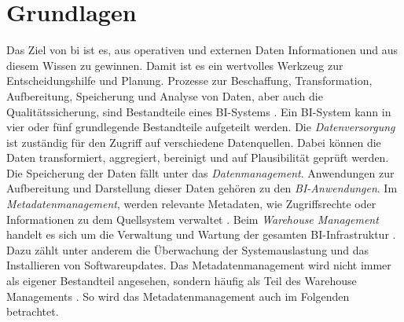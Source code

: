 \chapter{Grundlagen} %
\label{ch:background}
Das Ziel von \ac{bi} ist es, aus operativen und externen Daten Informationen und aus diesem Wissen zu gewinnen. Damit ist es ein wertvolles Werkzeug zur Entscheidungshilfe und Planung. Prozesse zur Beschaffung, Transformation, Aufbereitung, Speicherung und Analyse von Daten, aber auch die Qualitätssicherung, sind Bestandteile eines BI-Systems \cite{muller_business_2013}. Ein BI-System kann in vier oder fünf grundlegende Bestandteile aufgeteilt werden. Die \textit{Datenversorgung} ist zuständig für den Zugriff auf verschiedene Datenquellen. Dabei können die Daten transformiert, aggregiert, bereinigt und auf Plausibilität geprüft werden. Die Speicherung der Daten fällt unter das \textit{Datenmanagement}. Anwendungen zur Aufbereitung und Darstellung dieser Daten gehören zu den \textit{BI-Anwendungen}. Im \textit{Metadatenmanagement}, werden relevante Metadaten, wie Zugriffsrechte oder Informationen zu dem Quellsystem verwaltet \cite{kemper_bi-glossar_2008}. Beim \textit{Warehouse Management} handelt es sich um die Verwaltung und Wartung der gesamten BI-Infrastruktur \cite{grunwald_business_2009}. Dazu zählt unter anderem die Überwachung der Systemauslastung und das Installieren von Softwareupdates. Das {Metadatenmanagement} wird nicht immer als eigener Bestandteil angesehen, sondern häufig als Teil des {Warehouse Managements} \cite{humm_architektur_2005}. So wird das {Metadatenmanagement} auch im Folgenden betrachtet.


